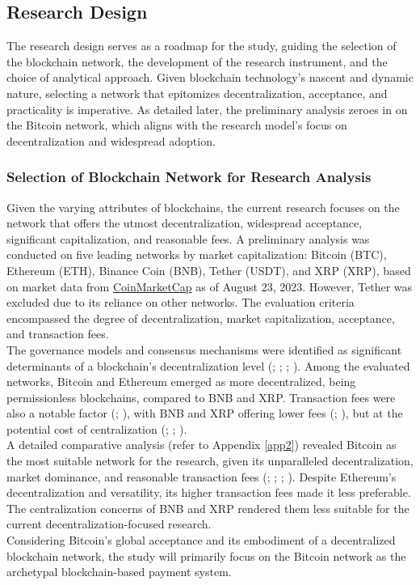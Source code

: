 \documentclass[twocolumn]{article}
\begin{document}
\subsection{Research Design}
The research design serves as a roadmap for the study, guiding the selection of the blockchain network, the development of the research instrument, and the choice of analytical approach. Given blockchain technology's nascent and dynamic nature, selecting a network that epitomizes decentralization, acceptance, and practicality is imperative. As detailed later, the preliminary analysis zeroes in on the Bitcoin network, which aligns with the research model's focus on decentralization and widespread adoption.

\subsubsection{Selection of Blockchain Network for Research Analysis}

Given the varying attributes of blockchains, the current research focuses on the network that offers the utmost decentralization, widespread acceptance, significant capitalization, and reasonable fees. A preliminary analysis was conducted on five leading networks by market capitalization: Bitcoin (BTC), Ethereum (ETH), Binance Coin (BNB), Tether (USDT), and XRP (XRP), based on market data from \href{https://www.coinmarketcap.com}{CoinMarketCap} as of August 23, 2023. However, Tether was excluded due to its reliance on other networks. The evaluation criteria encompassed the degree of decentralization, market capitalization, acceptance, and transaction fees.
\\The governance models and consensus mechanisms were identified as significant determinants of a blockchain's decentralization level (\cite{noauthor_ethereum_2023}; \cite{noauthor_governance_2023}; \cite{lee_analysis_2023}; \cite{rochard_bitcoin_2020}). Among the evaluated networks, Bitcoin and Ethereum emerged as more decentralized, being permissionless blockchains, compared to BNB and XRP. Transaction fees were also a notable factor (\cite{noauthor_bitcoin_2023}; \cite{noauthor_bitcoin_2023-1}), with BNB and XRP offering lower fees (\cite{noauthor_binance_2023}; \cite{noauthor_xrp_2023}), but at the potential cost of centralization (\cite{christodoulou_consensus_2020}; \cite{maksymyuk_blockchain-empowered_2022}; \cite{thomas_how_2017}).
\\A detailed comparative analysis (refer to Appendix \ref{app2}) revealed Bitcoin as the most suitable network for the research, given its unparalleled decentralization, market dominance, and reasonable transaction fees (\cite{davis_cryptocurrency_2023}; \cite{flynn_how_2022}; \cite{mallqui_predicting_2019}; \cite{vejacka_basic_2014}). Despite Ethereum's decentralization and versatility, its higher transaction fees made it less preferable. The centralization concerns of BNB and XRP rendered them less suitable for the current decentralization-focused research.
\\Considering Bitcoin's global acceptance and its embodiment of a decentralized blockchain network, the study will primarily focus on the Bitcoin network as the archetypal blockchain-based payment system. 
\end{document}
